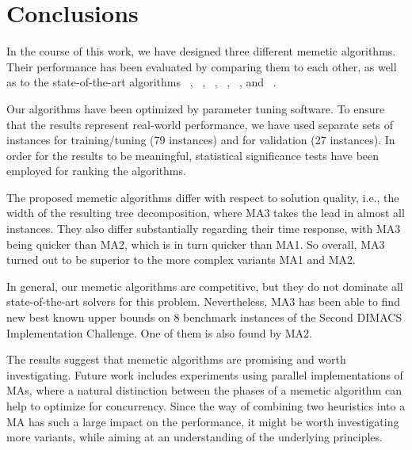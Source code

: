 \documentclass[thesis.tex]{subfiles}
\begin{document}
\chapter{Conclusions}
\label{ch:Conclusions}

In the course of this work, we have designed three different memetic algorithms. Their performance has been evaluated by comparing them to each other, as well as to the state-of-the-art algorithms ~\parencite{bachoore-bodlaender-2006-branchAndBound}, ~\parencite{gogate-2004-quickbb}, ~\parencite{clautiaux-2004-tabu}, ~\parencite{hammerl-thesis,hammerl-paper}, ~\parencite{schafhauser-thesis,schafhauser-paper}, and ~\parencite{musliu-2008-ILS}.

Our algorithms have been optimized by parameter tuning software. To ensure that the results represent real-world performance, we have used separate sets of instances for training/tuning (79 instances) and for validation (27 instances). In order for the results to be meaningful, statistical significance tests have been employed for ranking the algorithms.

The proposed memetic algorithms differ with respect to solution quality, i.e., the width of the resulting tree decomposition, where \gls{MA3} takes the lead in almost all instances. They also differ substantially regarding their time response, with \gls{MA3} being quicker than \gls{MA2}, which is in turn quicker than \gls{MA1}. So overall, \gls{MA3} turned out to be superior to the more complex variants \gls{MA1} and \gls{MA2}.

In general, our memetic algorithms are competitive, but they do not dominate all state-of-the-art solvers for this problem. Nevertheless, \gls{MA3} has been able to find new best known upper bounds on 8 benchmark instances of the Second \gls{DIMACS} Implementation Challenge. One of them is also found by \gls{MA2}.

The results suggest that memetic algorithms are promising and worth investigating. Future work includes experiments using parallel implementations of \glspl{MA}, where a natural distinction between the phases of a memetic algorithm can help to optimize for concurrency. Since the way of combining two heuristics into a \gls{MA} has such a large impact on the performance, it might be worth investigating more variants, while aiming at an understanding of the underlying principles.

\end{document}
